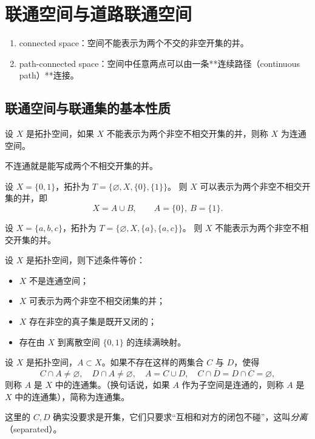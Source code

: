 \chapter{联通空间与道路联通空间}
\begin{enumerate}
    \item connected space：空间不能表示为两个不交的非空开集的并。
	\item path-connected space：空间中任意两点可以由一条**连续路径（continuous path）**连接。

\end{enumerate}
\section{联通空间与联通集的基本性质}
\begin{definition}[联通空间的定义]
设 $X$ 是拓扑空间，如果 $X$ 不能表示为两个非空不相交开集的并，则称 $X$ 为连通空间。
\end{definition}
\begin{dxtips}
    不连通就是能写成两个不相交开集的并。
\end{dxtips}
\begin{example}
设 $X=\{0,1\}$，拓扑为 $T=\{\varnothing, X, \{0\}, \{1\}\}$。  
则 $X$ 可以表示为两个非空不相交开集的并，即  
\[
X = A \cup B,\qquad A=\{0\},\ B=\{1\}.
\]
\end{example}

\begin{example}
设 $X=\{a,b,c\}$，拓扑为 $T=\{\varnothing, X, \{a\}, \{a,c\}\}$。  
则 $X$ 不能表示为两个非空不相交开集的并。
\end{example}
\begin{theorem}[不是连通的等价条件]
设 $X$ 是拓扑空间，则下述条件等价：
\begin{itemize}
    \item[(1)] $X$ 不是连通空间；
    \item[(2)] $X$ 可表示为两个非空不相交闭集的并；
    \item[(3)] $X$ 存在非空的真子集是既开又闭的；
    \item[(4)] 存在由 $X$ 到离散空间 $\{0,1\}$ 的连续满映射。
\end{itemize}
\end{theorem}
\begin{definition}[连通集的定义]
设 $X$ 是拓扑空间，$A\subset X$。如果不存在这样的两集合 $C$ 与 $D$，使得
\[
C\cap A\neq\varnothing,\quad D\cap A\neq\varnothing,\quad A=C\cup D,
\quad C\cap \overline{D}=D\cap \overline{C}=\varnothing,
\]
则称 $A$ 是 $X$ 中的连通集。（换句话说，如果 $A$ 作为子空间是连通的，则称 $A$ 是 $X$ 中的连通集），简称为连通集。
\end{definition}
\begin{note}
    这里的 $C,D$ 确实没要求是开集，它们只要求“互相和对方的闭包不碰”，这叫\emph{分离}（separated）。
\end{note}

